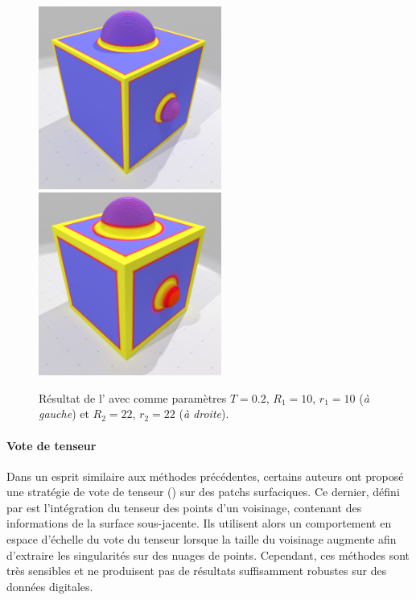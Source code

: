 \begin{figure}[ht]
  \centering
  \includegraphics[height=6cm]{images/Feature/CubeSphere_VCM_r_10}
  \includegraphics[height=6cm]{images/Feature/CubeSphere_VCM_r_22}
  \caption[Résultat de l']{Résultat de
  l' avec comme paramètres $T = 0.2$, $R_1 =
  10$, $r_1 = 10$ (\emph{à gauche}) et $R_2 = 22$, $r_2 = 22$ (\emph{à
  droite}).}\label{fig:VCM-cubesphere}
\end{figure}

\paragraph{Vote de tenseur}
%
%
Dans un esprit similaire aux méthodes précédentes, certains auteurs
\cite{Park2012} ont proposé une stratégie de vote de tenseur () sur des patchs surfaciques. Ce dernier, défini par
 est l'intégration du tenseur des points d'un
voisinage, contenant des informations de la surface sous-jacente. Ils utilisent
alors un comportement en espace d'échelle du vote du tenseur lorsque la taille du
voisinage augmente afin d'extraire les singularités sur des nuages de points.
Cependant, ces méthodes sont très sensibles et ne produisent pas de résultats
suffisamment robustes sur des données digitales.


